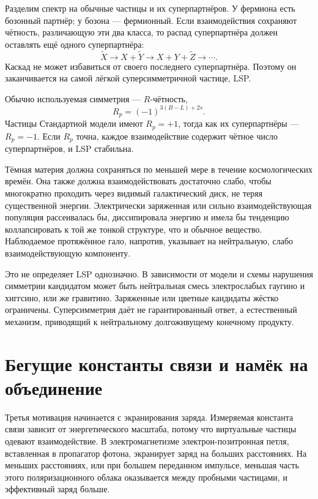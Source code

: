 Разделим спектр на обычные частицы и их суперпартнёров. У фермиона есть бозонный партнёр; у бозона — фермионный. Если взаимодействия сохраняют чётность, различающую эти два класса, то распад суперпартнёра должен оставлять ещё одного суперпартнёра:
\begin{equation}
\widetilde X
\longrightarrow X+\widetilde Y
\longrightarrow X+Y+\widetilde Z
\longrightarrow\cdots.
\end{equation}
Каскад не может избавиться от своего последнего суперпартнёра. Поэтому он заканчивается на самой лёгкой суперсимметричной частице, LSP.

Обычно используемая симметрия — \(R\)-чётность,
\begin{equation}
R_p=(-1)^{3(B-L)+2s}.
\end{equation}
Частицы Стандартной модели имеют \(R_p=+1\), тогда как их суперпартнёры — \(R_p=-1\). Если \(R_p\) точна, каждое взаимодействие содержит чётное число суперпартнёров, и LSP стабильна.

Тёмная материя должна сохраняться по меньшей мере в течение космологических времён. Она также должна взаимодействовать достаточно слабо, чтобы многократно проходить через видимый галактический диск, не теряя существенной энергии. Электрически заряженная или сильно взаимодействующая популяция рассеивалась бы, диссипировала энергию и имела бы тенденцию коллапсировать к той же тонкой структуре, что и обычное вещество. Наблюдаемое протяжённое гало, напротив, указывает на нейтральную, слабо взаимодействующую компоненту.

Это не определяет LSP однозначно. В зависимости от модели и схемы нарушения симметрии кандидатом может быть нейтральная смесь электрослабых гаугино и хиггсино, или же гравитино. Заряженные или цветные кандидаты жёстко ограничены. Суперсимметрия даёт не гарантированный ответ, а естественный механизм, приводящий к нейтральному долгоживущему конечному продукту.

\section{Бегущие константы связи и намёк на объединение}

Третья мотивация начинается с экранирования заряда. Измеряемая константа связи зависит от энергетического масштаба, потому что виртуальные частицы одевают взаимодействие. В электромагнетизме электрон-позитронная петля, вставленная в пропагатор фотона, экранирует заряд на больших расстояниях. На меньших расстояниях, или при большем переданном импульсе, меньшая часть этого поляризационного облака оказывается между пробными частицами, и эффективный заряд больше.

